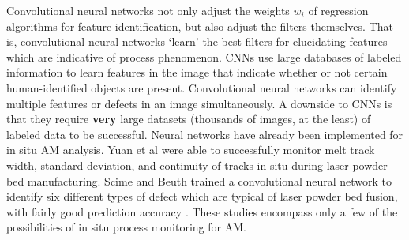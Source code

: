 Convolutional neural networks not only adjust the weights $w_i$ of regression algorithms for feature identification, but also adjust the filters themselves. That is, convolutional neural networks `learn' the best filters for elucidating features which are indicative of process phenomenon.  CNNs use large databases of labeled information to learn features in the image that indicate whether or not certain human-identified objects are present. Convolutional neural networks can identify multiple features or defects in an image simultaneously. A downside to CNNs is that they require \textbf{very} large datasets (thousands of images, at the least) of labeled data to be successful. Neural networks have already been implemented for in situ AM analysis. Yuan et al \cite{Yuan2018} were able to successfully monitor melt track width, standard deviation, and continuity of tracks in situ during laser powder bed manufacturing. Scime and Beuth trained a convolutional neural network to identify six different types of defect which are typical of laser powder bed fusion, with fairly good prediction accuracy \cite{Scime2018}. These studies encompass only a few of the possibilities of in situ process monitoring for AM. 




